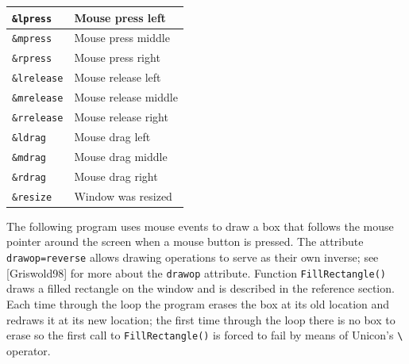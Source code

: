 \begin{center}
\begin{supertabular}{|m{0.9247598in}|m{2.3525598in}|}
\texttt{\&lpress} &
Mouse press left\\\hline
\texttt{\&mpress} &
Mouse press middle\\\hline
\texttt{\&rpress} &
Mouse press right\\\hline
\texttt{\&lrelease} &
Mouse release left\\\hline
\texttt{\&mrelease} &
Mouse release middle\\\hline
\texttt{\&rrelease} &
Mouse release right \\\hline
\texttt{\&ldrag} &
Mouse drag left \\\hline
\texttt{\&mdrag} &
Mouse drag middle \\\hline
\texttt{\&rdrag} &
Mouse drag right \\\hline
\texttt{\&resize} &
Window was resized \\\hline
\end{supertabular}
\end{center}
The following program uses mouse events to draw a box that follows the
mouse pointer around the screen when a mouse button is pressed. The
attribute \texttt{drawop=reverse} allows drawing operations to serve
as their own inverse; see [Griswold98] for more about the
\texttt{drawop} attribute. Function \texttt{FillRectangle()} draws a
filled rectangle on the window and is described in the reference
section. Each time through the loop the program erases the box at its
old location and redraws it at its new location; the first time
through the loop there is no box to erase so the first call to
\texttt{FillRectangle()} is forced to fail by means of Unicon's
\texttt{{\textbackslash}} operator.


